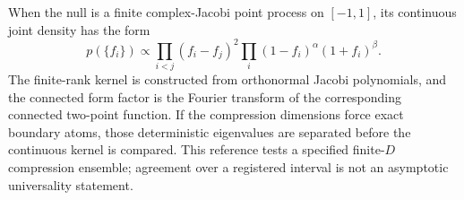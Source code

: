 When the null is a finite complex-Jacobi point process on $[-1,1]$, its
continuous joint density has the form
\[
 p(\{f_i\})\propto
 \prod_{i<j}(f_i-f_j)^2
 \prod_i(1-f_i)^{\alpha}(1+f_i)^{\beta}.
\]
The finite-rank kernel is constructed from orthonormal Jacobi polynomials, and
the connected form factor is the Fourier transform of the corresponding
connected two-point function.  If the compression dimensions force exact
boundary atoms, those deterministic eigenvalues are separated before the
continuous kernel is compared.  This reference tests a specified finite-$D$
compression ensemble; agreement over a registered interval is not an
asymptotic universality statement.
